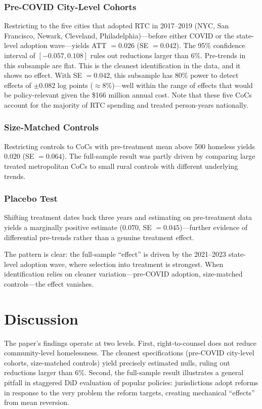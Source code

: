 \documentclass[12pt]{article}
\begin{document}
\subsubsection*{Pre-COVID City-Level Cohorts} Restricting to the five cities that adopted RTC in 2017--2019 (NYC, San Francisco, Newark, Cleveland, Philadelphia)---before either COVID or the state-level adoption wave---yields ATT $= 0.026$ (SE $= 0.042$). The 95\% confidence interval of $[-0.057, 0.108]$ rules out reductions larger than 6\%. Pre-trends in this subsample are flat. This is the cleanest identification in the data, and it shows no effect. With SE $= 0.042$, this subsample has 80\% power to detect effects of $\pm 0.082$ log points ($\approx 8\%$)---well within the range of effects that would be policy-relevant given the \$166 million annual cost. Note that these five CoCs account for the majority of RTC spending and treated person-years nationally.

\subsubsection*{Size-Matched Controls} Restricting controls to CoCs with pre-treatment mean above 500 homeless yields $0.020$ (SE $= 0.064$). The full-sample result was partly driven by comparing large treated metropolitan CoCs to small rural controls with different underlying trends.

\subsubsection*{Placebo Test} Shifting treatment dates back three years and estimating on pre-treatment data yields a marginally positive estimate ($0.070$, SE $= 0.045$)---further evidence of differential pre-trends rather than a genuine treatment effect.

The pattern is clear: the full-sample ``effect'' is driven by the 2021--2023 state-level adoption wave, where selection into treatment is strongest. When identification relies on cleaner variation---pre-COVID adoption, size-matched controls---the effect vanishes.


\section{Discussion}
\label{sec:discussion}

The paper's findings operate at two levels. First, right-to-counsel does not reduce community-level homelessness. The cleanest specifications (pre-COVID city-level cohorts, size-matched controls) yield precisely estimated nulls, ruling out reductions larger than 6\%. Second, the full-sample result illustrates a general pitfall in staggered DiD evaluation of popular policies: jurisdictions adopt reforms in response to the very problem the reform targets, creating mechanical ``effects'' from mean reversion.
\end{document}
